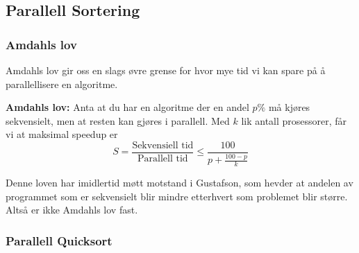 \subsection{\color{red}Parallell Sortering}

\subsubsection{Amdahls lov}
\label{sec:amdahl}

Amdahls lov gir oss en slags øvre grense for hvor mye tid vi kan spare på å
parallellisere en algoritme.
\begin{teorem}\textbf{Amdahls lov: } 
  Anta at du har en algoritme der en andel
  $p\%$ må kjøres sekvensielt, men at resten kan gjøres i parallell.
  Med $k$ lik antall prosessorer, får vi at maksimal speedup er
  \[
    S = \frac{\text{Sekvensiell tid}}{\text{Parallell tid}} \leq \frac{100}{p + \frac{100 - p}{k}}
  \]
\end{teorem}

Denne loven har imidlertid møtt motstand i Gustafson, som hevder at andelen av
programmet som er sekvensielt blir mindre etterhvert som problemet blir større.
Altså er ikke Amdahls lov fast.

\subsubsection{\color{red}Parallell Quicksort}\label{parquick}
